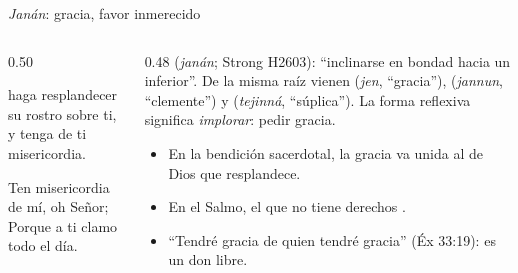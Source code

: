 \begin{frame}{\emph{Janán}: gracia, favor inmerecido}
\begin{columns}[t,onlytextwidth]
\begin{column}{0.50\textwidth}
\begin{cita}\SENOR{} haga resplandecer su rostro sobre ti, y tenga de ti misericordia.\end{cita}
\begin{center}\end{center}
\begin{cita}Ten misericordia de mí, oh Señor; Porque a ti clamo todo el día.\end{cita}
\begin{center}\end{center}
\end{column}
\begin{column}{0.48\textwidth}\scriptsize
{} (\emph{janán}; Strong H2603): ``inclinarse en bondad hacia un inferior''. De la misma raíz vienen  (\emph{jen}, ``gracia''),  (\emph{jannun}, ``clemente'') y  (\emph{tejinná}, ``súplica''). La forma reflexiva significa \emph{implorar}: pedir gracia.\par\medskip
\small
\begin{itemize}
\item En la bendición sacerdotal, la gracia va unida al  de Dios que resplandece.
\item En el Salmo, el que no tiene derechos .
\item ``Tendré gracia de quien tendré gracia'' (Éx 33:19): es un don libre.
\end{itemize}
\end{column}
\end{columns}
\end{frame}

